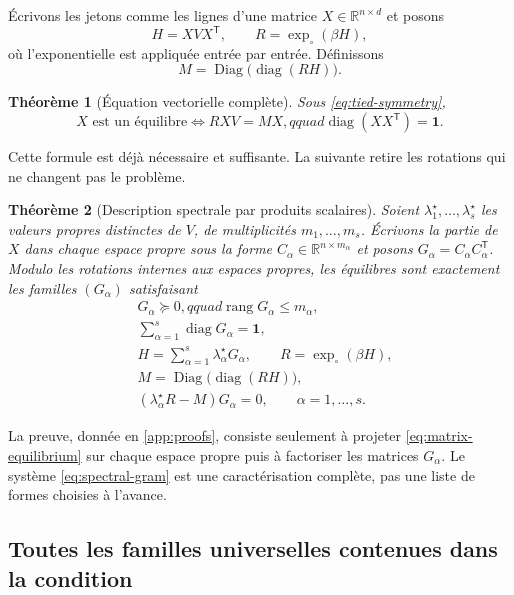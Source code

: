 \documentclass[11pt,a4paper]{article}
\newtheorem{theorem}{Théorème}[section]
\theoremstyle{definition}
\newcommand{\R}{\mathbb R}
\newcommand{\diag}{\operatorname{diag}}
\newcommand{\Diag}{\operatorname{Diag}}
\newcommand{\rank}{\operatorname{rang}}
\newcommand{\T}{\mathsf T}
\newcommand{\one}{\bm 1}
\begin{document}
Écrivons les jetons comme les lignes d'une matrice $X\in\R^{n\times d}$ et posons
\[
 H=XVX^{\T},\qquad R=\exp_\circ(\beta H),
\]
où l'exponentielle est appliquée entrée par entrée. Définissons
\[
 M=\Diag\bigl(\diag(RH)\bigr).
\]

\begin{theorem}[Équation vectorielle complète]
\label{thm:vector-complete}
Sous \eqref{eq:tied-symmetry},
\begin{equation}
 \boxed{\quad X\text{ est un équilibre}
 \iff RXV=MX,qquad \diag(XX^{\T})=\one.\quad}              \label{eq:matrix-equilibrium}
\end{equation}
\end{theorem}

Cette formule est déjà nécessaire et suffisante. La suivante retire les rotations qui ne
changent pas le problème.

\begin{theorem}[Description spectrale par produits scalaires]
\label{thm:spectral-gram}
Soient $\lambda_1^\star,\ldots,\lambda_s^\star$ les valeurs propres distinctes de $V$,
de multiplicités $m_1,\ldots,m_s$. Écrivons la partie de $X$ dans chaque espace propre
sous la forme $C_\alpha\in\R^{n\times m_\alpha}$ et posons
$G_\alpha=C_\alpha C_\alpha^{\T}$. Modulo les rotations internes aux espaces propres,
les équilibres sont exactement les familles $(G_\alpha)$ satisfaisant
\begin{equation}
\boxed{
\begin{aligned}
 &G_\alpha\succeq0,qquad \rank G_\alpha\le m_\alpha,\\
 &\sum_{\alpha=1}^s\diag G_\alpha=\one,\\
 &H=\sum_{\alpha=1}^s\lambda_\alpha^\star G_\alpha,
 \qquad R=\exp_\circ(\beta H),\\
 &M=\Diag\bigl(\diag(RH)\bigr),\\
 &(\lambda_\alpha^\star R-M)G_\alpha=0,
 \qquad \alpha=1,\ldots,s.
\end{aligned}}                                             \label{eq:spectral-gram}
\end{equation}
\end{theorem}

La preuve, donnée en \cref{app:proofs}, consiste seulement à projeter
\eqref{eq:matrix-equilibrium} sur chaque espace propre puis à factoriser les matrices
$G_\alpha$. Le système \eqref{eq:spectral-gram} est une caractérisation complète, pas
une liste de formes choisies à l'avance.

\subsection{Toutes les familles universelles contenues dans la condition}
\end{document}
